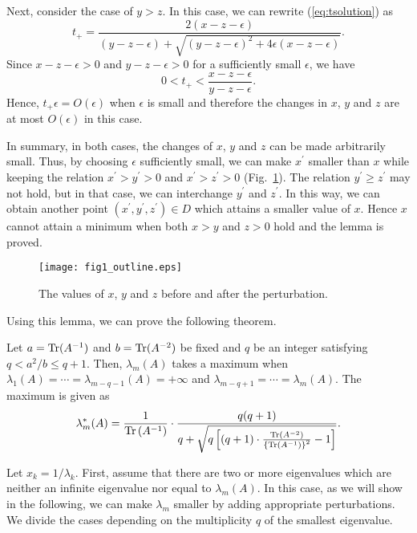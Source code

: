 \documentclass{amsart}
\begin{document}
Next, consider the case of $y>z$. In this case, we can rewrite (\ref{eq:tsolution}) as
\begin{equation}
t_+ = \frac{2(x-z-\epsilon)}{(y-z-\epsilon)+\sqrt{(y-z-\epsilon)^2+4\epsilon(x-z-\epsilon)}}.
\end{equation}
Since $x-z-\epsilon>0$ and $y-z-\epsilon>0$ for a sufficiently small $\epsilon$, we have
\begin{equation}
0 < t_+ < \frac{x-z-\epsilon}{y-z-\epsilon}.
\end{equation}
Hence, $ t_+\epsilon=O(\epsilon)$ when $\epsilon$ is small and therefore the changes in $x$, $y$ and $z$ are at most $O(\epsilon)$ in this case.

In summary, in both cases, the changes of $x$, $y$ and $z$ can be made arbitrarily small. Thus, by choosing $\epsilon$ sufficiently small, we can make $x^{\prime}$ smaller than $x$ while keeping the relation $x^{\prime}>y^{\prime}>0$ and $x^{\prime}>z^{\prime}>0$ (Fig.~\ref{fig:fig1}). The relation $y^{\prime}\ge z^{\prime}$ may not hold, but in that case, we can interchange $y^{\prime}$ and $z^{\prime}$. In this way, we can obtain another point $(x^{\prime}, y^{\prime}, z^{\prime})\in D$ which attains a smaller value of $x$. Hence $x$ cannot attain a minimum when both $x>y$ and $z>0$ hold and the lemma is proved.
\endproof

\begin{figure}[h]
\centerline{\texttt{[image: fig1\_outline.eps]}}
\caption{The values of $x$, $y$ and $z$ before and after the perturbation.}
\label{fig:fig1}
\end{figure}

Using this lemma, we can prove the following theorem.
\begin{The}
\label{T3}
Let $a={\rm Tr}(A^{-1}) $ and $b={\rm Tr}(A^{-2})$ be fixed and $q$ be an integer satisfying $q<a^2/b\le q+1$. Then, $\lambda_m(A)$ takes a maximum when $\lambda_1(A)=\cdots=\lambda_{m-q-1}(A)=+\infty$ and $\lambda_{m-q+1}=\cdots=\lambda_m(A)$. The maximum is given as
\begin{equation}
\lambda_m^*(A) = \frac{1}{{\rm Tr}\left(A^{-1}\right)}\cdot\frac{q(q+1)}{q+\sqrt{q\left[(q+1)\cdot\frac{{\rm Tr}\left(A^{-2}\right)}{\left\{{\rm Tr}\left(A^{-1}\right)\right\}^2}-1\right]}}.
\label{eq:Theorem3}
\end{equation}

\end{The}
\proof
Let $x_k=1/\lambda_k$. First, assume that there are two or more eigenvalues which are neither an infinite eigenvalue nor equal to $\lambda_m(A)$. In this case, as we will show in the following, we can make $\lambda_m$ smaller by adding appropriate perturbations. We divide the cases depending on the multiplicity $q$ of the smallest eigenvalue.
\end{document}
